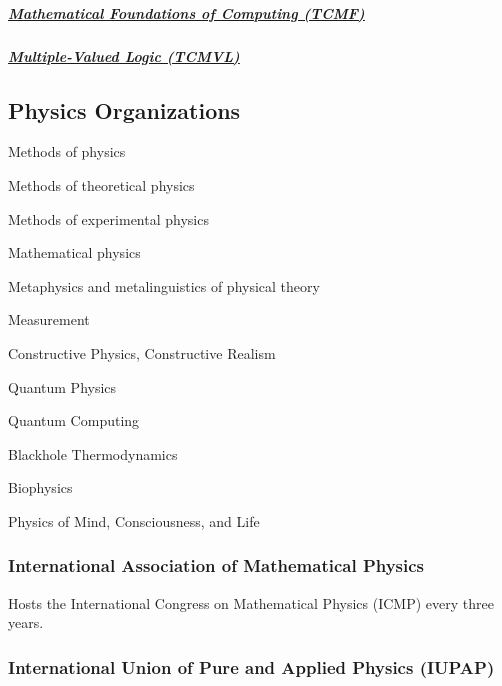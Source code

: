 \hypertarget{mathematical-foundations-of-computing-tcmf}{%
\subparagraph{\texorpdfstring{\href{https://www.computer.org/communities/technical-committees/tcmf}{\ul{Mathematical
Foundations of Computing
(TCMF)}}}{Mathematical Foundations of Computing (TCMF)}}\label{mathematical-foundations-of-computing-tcmf}}

\hypertarget{multiple-valued-logic-tcmvl}{%
\subparagraph{\texorpdfstring{\href{https://www.computer.org/communities/technical-committees/tcmvl}{\ul{Multiple-Valued
Logic
(TCMVL)}}}{Multiple-Valued Logic (TCMVL)}}\label{multiple-valued-logic-tcmvl}}

\hypertarget{physics-organizations}{%
\subsection{Physics Organizations}\label{physics-organizations}}

Methods of physics

Methods of theoretical physics

Methods of experimental physics

Mathematical physics

Metaphysics and metalinguistics of physical theory

Measurement

Constructive Physics, Constructive Realism

Quantum Physics

Quantum Computing

Blackhole Thermodynamics

Biophysics

Physics of Mind, Consciousness, and Life

\hypertarget{international-association-of-mathematical-physics}{%
\subsubsection{International Association of Mathematical
Physics}\label{international-association-of-mathematical-physics}}

Hosts the International Congress on Mathematical Physics (ICMP) every
three years.

\hypertarget{international-union-of-pure-and-applied-physics-iupap}{%
\subsubsection{International Union of Pure and Applied Physics
(IUPAP)}\label{international-union-of-pure-and-applied-physics-iupap}}

